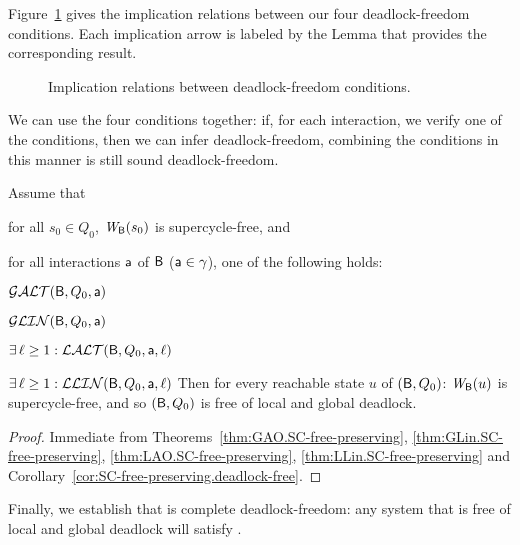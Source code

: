 

Figure~\ref{fig:implications} gives the implication relations between our four deadlock-freedom conditions.
Each implication arrow is labeled by the Lemma that provides the corresponding result.
\begin{figure}[ht]
\begin{center}
\scalebox{0.8}{}
\caption{Implication relations between deadlock-freedom conditions.}
\label{fig:implications}
\end{center}
\end{figure}


We can use the four conditions together: if, for each interaction, we verify one of the conditions, then we can infer deadlock-freedom, \ie combining the conditions in this manner is still sound \wrt deadlock-freedom.

\begin{theorem}
\label{theorem:local.deadlock-free}
\label{thm:local.deadlock-free}
Assume that
\bn
\item \label{theorem:local.deadlock-free.initial}
      for all $s_0 \in Q_0$, $\mathit{W}_{\mathsf{B}}({s_0})$ is supercycle-free, and
\item \label{theorem:local.deadlock-free.scfPres}
      for all interactions $\mathsf{a}$ of $\mathsf{B}$ (\ie $\mathsf{a} \in \gamma$), one of
      the following holds:
      \bn
      \item $\mathcal{GALT}(\mathsf{B},Q_0,\mathsf{a})$
      \item $\mathcal{GLIN}(\mathsf{B},Q_0,\mathsf{a})$
      \item $\exists\, \ell \ge 1: \mathcal{LALT}(\mathsf{B},Q_0,\mathsf{a},\ell)$ 
      \item $\exists\, \ell \ge 1: \mathcal{LLIN}(\mathsf{B},Q_0,\mathsf{a},\ell)$ 
      \en
\en
Then for every reachable state $u$ of $(\mathsf{B}, Q_0)$:  $\mathit{W}_{\mathsf{B}}({u})$ is supercycle-free, and so 
$(\mathsf{B}, Q_0)$ is free of local and global deadlock.
\end{theorem}
%
\begin{proof}
Immediate from
Theorems~\ref{thm:GAO.SC-free-preserving}, \ref{thm:GLin.SC-free-preserving}, \ref{thm:LAO.SC-free-preserving}, \ref{thm:LLin.SC-free-preserving}
and Corollary~\ref{cor:SC-free-preserving.deadlock-free}.
\end{proof}




Finally, we establish that \GAO is complete \wrt deadlock-freedom: any system that is free of local and global deadlock will satisfy \GAO.

